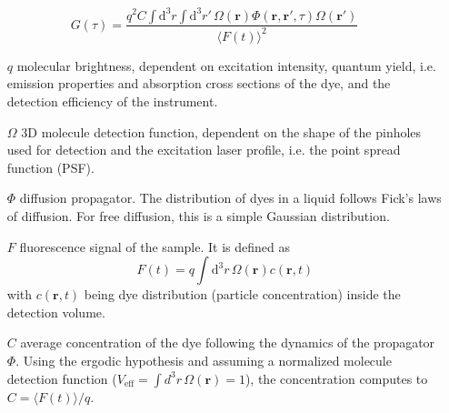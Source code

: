 	\newline
	\begin{minipage}{\textwidth}
	\begin{equation}
	G(\tau) = \frac{  q^2 C \int \! \mathrm{d}^3 r \int \! \mathrm{d}^3 r'  \, \Omega(\mathbf{r})\Phi(\mathbf{r}, \mathbf{r'}, \tau) \Omega(\mathbf{r'})  }{\langle F(t) \rangle^2}
	\end{equation}
	\begin{itemize} \small
	\item[$q$] molecular brightness, dependent on excitation intensity, quantum yield, i.e. emission properties and absorption cross sections of the dye, and the detection efficiency of the instrument.
	\item[$\Omega$] 3D molecule detection function, dependent on the shape of the pinholes used for detection and the excitation laser profile, i.e. the point spread function (PSF).
	\item[$\Phi$] diffusion propagator. The distribution of dyes in a liquid follows Fick's laws of diffusion. For free diffusion, this is a simple Gaussian distribution.
	\item[$F$] fluorescence signal of the sample. It is defined as
	\[ F(t) = q \int \! \mathrm{d}^3 r \, \Omega(\mathbf{r}) c(\mathbf{r}, t) \] with $c(\mathbf{r}, t)$ being dye distribution (particle concentration) inside the detection volume.
		\item[$C$] average concentration of the dye following the dynamics of the propagator $\Phi$. Using the ergodic hypothesis and assuming a normalized molecule detection function (${V_\mathrm{eff} = \int \!\! d^3r \, \Omega(\mathbf{r}) = 1}$), the concentration computes to $ C = \langle F(t) \rangle / q$.
	\end{itemize}
	\end{minipage}
	
	
